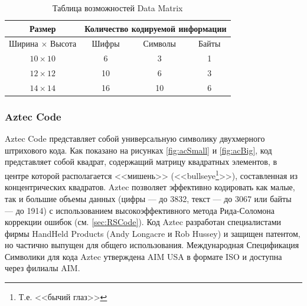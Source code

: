 \begin{table}[htb]
\centering
\caption{Таблица возможностей Data Matrix}
\begin{tabular}{|c|c|c|c|}
    \hline 
    Размер & \multicolumn{3}{c|}{Количество кодируемой информации} \\ 
    
    \hline 
    Ширина $\times$ Высота & Шифры & Символы & Байты \\
    
    \hline 
    $10 \times 10$ & 6 & 3 & 1 \\
    
    \hline 
    $12 \times 12$ & 10 & 6 & 3 \\
    
    \hline 
    $14 \times 14$ & 16 & 10 & 6 \\
    
    \hline
\end{tabular} 
\end{table}
 

\subsubsection{Aztec Code}

Aztec Code представляет собой универсальную символику двухмерного
штрихового кода. Как показано на рисунках \ref{fig:acSmall} и \ref{fig:acBig},
код представляет собой квадрат, 
содержащий матрицу квадратных элементов, в центре которой располагается 
<<мишень>> (<<bullseye\footnote{Т.е. <<бычий глаз>> }>>), 
составленная из концентрических квадратов. Aztec 
позволяет эффективно кодировать как малые, так и большие объемы данных 
(цифры --- до 3832, текст --- до 3067 или байты --- до 1914) с 
использованием высокоэффективного метода Рида-Соломона коррекции ошибок 
(см. \ref{sec:RSCode}). Код Aztec разработан специалистами фирмы 
HandHeld Products (Andy Longacre и Rob Hussey) и защищен патентом, но частично 
выпущен для общего использования. Международная Спецификация Символики для 
кода Aztec утверждена AIM USA в формате ISO и доступна через филиалы AIM.



